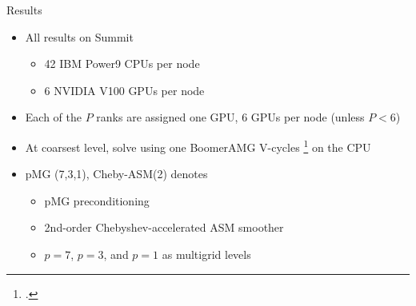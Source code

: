 \begin{frame}{Results}
  \begin{itemize}
    \item All results on Summit
    \begin{itemize}
      \item 42 IBM Power9 CPUs per node
      \item 6 NVIDIA V100 GPUs per node
    \end{itemize}
    \item Each of the $P$ ranks are assigned one GPU, 6 GPUs per node (unless $P<6$)
    \item At coarsest level, solve using one BoomerAMG V-cycles \footcite{henson_boomeramg_2002} on the CPU
    \item pMG (7,3,1), Cheby-ASM(2) denotes
    \begin{itemize}
      \item pMG preconditioning
      \item 2nd-order Chebyshev-accelerated ASM smoother
      \item $p=7$, $p=3$, and $p=1$ as multigrid levels
    \end{itemize}
  \end{itemize}
\end{frame}